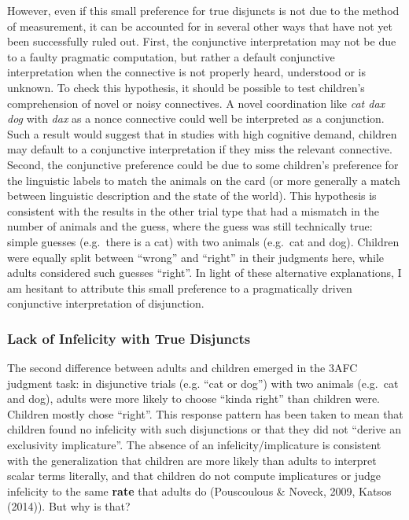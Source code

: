 \documentclass[man]{apa6}
\theoremstyle{definition}
\theoremstyle{definition}
\theoremstyle{definition}
\theoremstyle{remark}
\begin{document}
However, even if this small preference for true disjuncts is not due to
the method of measurement, it can be accounted for in several other ways
that have not yet been successfully ruled out. First, the conjunctive
interpretation may not be due to a faulty pragmatic computation, but
rather a default conjunctive interpretation when the connective is not
properly heard, understood or is unknown. To check this hypothesis, it
should be possible to test children's comprehension of novel or noisy
connectives. A novel coordination like \emph{cat dax dog} with
\emph{dax} as a nonce connective could well be interpreted as a
conjunction. Such a result would suggest that in studies with high
cognitive demand, children may default to a conjunctive interpretation
if they miss the relevant connective. Second, the conjunctive preference
could be due to some children's preference for the linguistic labels to
match the animals on the card (or more generally a match between
linguistic description and the state of the world). This hypothesis is
consistent with the results in the other trial type that had a mismatch
in the number of animals and the guess, where the guess was still
technically true: simple guesses (e.g.~there is a cat) with two animals
(e.g.~cat and dog). Children were equally split between \enquote{wrong}
and \enquote{right} in their judgments here, while adults considered
such guesses \enquote{right}. In light of these alternative
explanations, I am hesitant to attribute this small preference to a
pragmatically driven conjunctive interpretation of disjunction.

\subsubsection{Lack of Infelicity with True
Disjuncts}\label{lack-of-infelicity-with-true-disjuncts}

The second difference between adults and children emerged in the 3AFC
judgment task: in disjunctive trials (e.g. \enquote{cat or dog}) with
two animals (e.g.~cat and dog), adults were more likely to choose
\enquote{kinda right} than children were. Children mostly chose
\enquote{right}. This response pattern has been taken to mean that
children found no infelicity with such disjunctions or that they did not
\enquote{derive an exclusivity implicature}. The absence of an
infelicity/implicature is consistent with the generalization that
children are more likely than adults to interpret scalar terms
literally, and that children do not compute implicatures or judge
infelicity to the same \textbf{rate} that adults do (Pouscoulous \&
Noveck, 2009, Katsos (2014)). But why is that?
\end{document}
